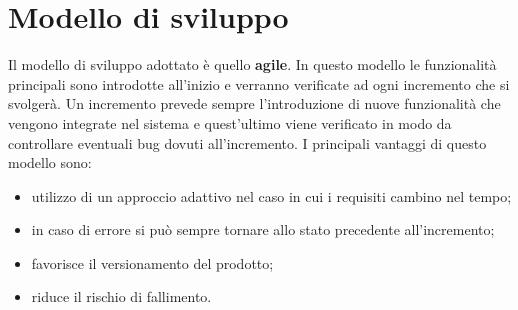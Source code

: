 \section{Modello di sviluppo}
Il modello di sviluppo adottato è quello \textbf{agile}. In questo
modello le funzionalità principali sono introdotte all'inizio e verranno verificate
ad ogni incremento che si svolgerà. Un incremento prevede sempre l'introduzione di nuove
funzionalità che vengono integrate nel sistema e quest'ultimo viene verificato in modo da
controllare eventuali bug dovuti all'incremento. I principali vantaggi di questo modello sono:
\begin{itemize}
    \item utilizzo di un approccio adattivo nel caso in cui i requisiti cambino nel tempo;
    \item in caso di errore si può sempre tornare allo stato precedente all'incremento;
    \item favorisce il versionamento del prodotto;
    \item riduce il rischio di fallimento.
\end{itemize}